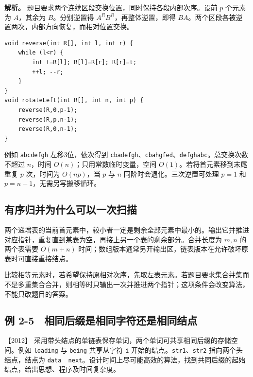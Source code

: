 
\textbf{解析。} 题目要求两个连续区段交换位置，同时保持各段内部次序。设前 \(p\) 个元素为 \(A\)，其余为 \(B\)。分别逆置得 \(A^RB^R\)，再整体逆置，即得 \(BA\)。两个区段各被逆置两次，内部方向恢复，而相对位置交换。

\par\medskip\noindent
\begin{minipage}{\linewidth}
\begin{verbatim}
void reverse(int R[], int l, int r) {
    while (l<r) {
        int t=R[l]; R[l]=R[r]; R[r]=t;
        ++l; --r;
    }
}
void rotateLeft(int R[], int n, int p) {
    reverse(R,0,p-1);
    reverse(R,p,n-1);
    reverse(R,0,n-1);
}
\end{verbatim}
\end{minipage}\par\medskip

例如 \texttt{abcdefgh} 左移3位，依次得到 \texttt{cbadefgh}、\texttt{cbahgfed}、\texttt{defghabc}。总交换次数不超过 \(n\)，时间 \(O(n)\)；只用常数临时变量，空间 \(O(1)\)。若将首元素移到末尾重复 \(p\) 次，时间为 \(O(np)\)，当 \(p\) 与 \(n\) 同阶时会退化。三次逆置可处理 \(p=1\) 和 \(p=n-1\)，无需另写搬移循环。

\subsection{有序归并为什么可以一次扫描}\label{ds-c02-h151}

两个递增表的当前首元素中，较小者一定是剩余全部元素中最小的。输出它并推进对应指针，重复直到某表为空，再接上另一个表的剩余部分。合并长度为 \(m,n\) 的两个表需要 \(O(m+n)\) 时间；数组版本通常另开输出区，链表版本在允许破坏原表时可直接重接结点。

比较相等元素时，若希望保持原相对次序，先取左表元素。若题目要求集合并集而不是多重集合合并，则相等时只输出一次并推进两个指针；这项条件会改变算法，不能只改题目的答案。

\subsection{例 2-5　相同后缀是相同字符还是相同结点}\label{ds-ex2-5}

\noindent{}【2012】 采用带头结点的单链表保存单词，两个单词可共享相同后缀的存储空间。例如 \texttt{loading} 与 \texttt{being} 共享从字符 \texttt{i} 开始的结点。\texttt{str1}、\texttt{str2} 指向两个头结点，结点为 \texttt{data\ \textbar{}\ next}。设计时间上尽可能高效的算法，找到共同后缀的起始结点，给出思想、程序及时间复杂度。

